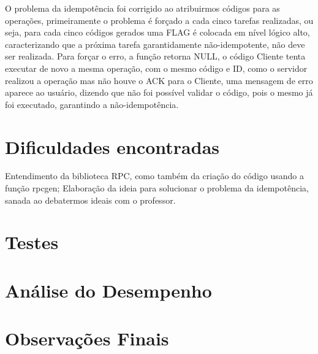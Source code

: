 \documentclass{article}
\begin{document}
\begin{multicols*}{2}
\newline
O problema da idempotência foi corrigido ao atribuirmos códigos para as operações, primeiramente o problema é forçado a cada cinco tarefas realizadas, ou seja, para cada cinco códigos gerados uma FLAG é colocada em nível lógico alto, caracterizando que a próxima tarefa garantidamente não-idempotente, não deve ser realizada. Para forçar o erro, a função retorna NULL, o código Cliente tenta executar de novo a mesma operação, com o mesmo código e ID, como o servidor realizou a operação mas não houve o ACK para o Cliente, uma mensagem de erro aparece ao usuário, dizendo que não foi possível validar o código, pois o mesmo já foi executado, garantindo a não-idempotência.

\section{Dificuldades encontradas}
Entendimento da biblioteca RPC, como também da criação do código usando a função rpcgen; Elaboração da ideia para solucionar o problema da idempotência, sanada ao debatermos ideais com o professor.

\section{Testes}


\section{Análise do Desempenho}


\section{Observações Finais}


\end{multicols*}
\end{document}
